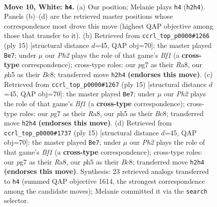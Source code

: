 \documentclass[11pt]{article}
\begin{document}
\clearpage

\begin{figure}[p]\centering
\begin{subfigure}{0.46\textwidth}\centering
\resizebox{\linewidth}{!}{%
\newchessgame
\chessboard[
  setfen={r1bqkb1r/1pp3p1/1nn5/p3pp1p/8/2NP1NP1/PP2PPBP/R1BQ1R1K w kq - 0 10},
  showmover=false,
  pgfstyle=straightmove, color=movearrow, markmove={h2-h4}
]}
\caption{}
\end{subfigure}\hfill
\begin{subfigure}{0.46\textwidth}\centering
\resizebox{\linewidth}{!}{%
\newchessgame
\chessboard[
  setfen={r1bqkb1r/1p3ppp/p1nppn2/8/2P1P3/N1N5/PP3PPP/R1BQKB1R b KQkq - 1 8},
  showmover=false,
  pgfstyle=straightmove, color=movearrow, markmove={f8-e7}
]}
\caption{}
\end{subfigure}
\\[4pt]
\begin{subfigure}{0.46\textwidth}\centering
\resizebox{\linewidth}{!}{%
\newchessgame
\chessboard[
  setfen={r1bqkb1r/1p3ppp/p1nppn2/8/2P1P3/N1N5/PP3PPP/R1BQKB1R b KQkq - 1 8},
  showmover=false,
  pgfstyle=straightmove, color=movearrow, markmove={f8-e7}
]}
\caption{}
\end{subfigure}\hfill
\begin{subfigure}{0.46\textwidth}\centering
\resizebox{\linewidth}{!}{%
\newchessgame
\chessboard[
  setfen={r1bqkb1r/1p3ppp/p1nppn2/8/2P1P3/N1N5/PP3PPP/R1BQKB1R b KQkq - 1 8},
  showmover=false,
  pgfstyle=straightmove, color=movearrow, markmove={f8-e7}
]}
\caption{}
\end{subfigure}
\caption{\textbf{Move 10, White: \texttt{h4}.} (a) Our position; Melanie plays \texttt{h4} (\texttt{h2h4}). Panels (b)--(d) are the retrieved master positions whose correspondence most drove this move (highest QAP objective among those that transfer to it). (b) Retrieved from \texttt{ccrl\_top\_p0000\#1266} (ply 15) [structural distance $d$=45, QAP obj=70]: the master played \texttt{Be7}; under $\mu$ our \emph{Ph2} plays the role of that game's \emph{Bf1} (a \textbf{cross-type} correspondence); cross-type roles: our \emph{p}g7 as their \emph{R}a8, our \emph{p}h5 as their \emph{B}c8; transferred move \texttt{h2h4} \textbf{(endorses this move)}. (c) Retrieved from \texttt{ccrl\_top\_p0000\#1267} (ply 15) [structural distance $d$=45, QAP obj=70]: the master played \texttt{Be7}; under $\mu$ our \emph{Ph2} plays the role of that game's \emph{Bf1} (a \textbf{cross-type} correspondence); cross-type roles: our \emph{p}g7 as their \emph{R}a8, our \emph{p}h5 as their \emph{B}c8; transferred move \texttt{h2h4} \textbf{(endorses this move)}. (d) Retrieved from \texttt{ccrl\_top\_p0000\#1737} (ply 15) [structural distance $d$=45, QAP obj=70]: the master played \texttt{Be7}; under $\mu$ our \emph{Ph2} plays the role of that game's \emph{Bf1} (a \textbf{cross-type} correspondence); cross-type roles: our \emph{p}g7 as their \emph{R}a8, our \emph{p}h5 as their \emph{B}c8; transferred move \texttt{h2h4} \textbf{(endorses this move)}. Synthesis: 23 retrieved analogs transferred to \texttt{h4} (summed QAP objective 1614, the strongest correspondence among the candidate moves); Melanie committed it via the \texttt{search} selector.}
\label{fig:thought-m18}
\end{figure}
\end{document}
